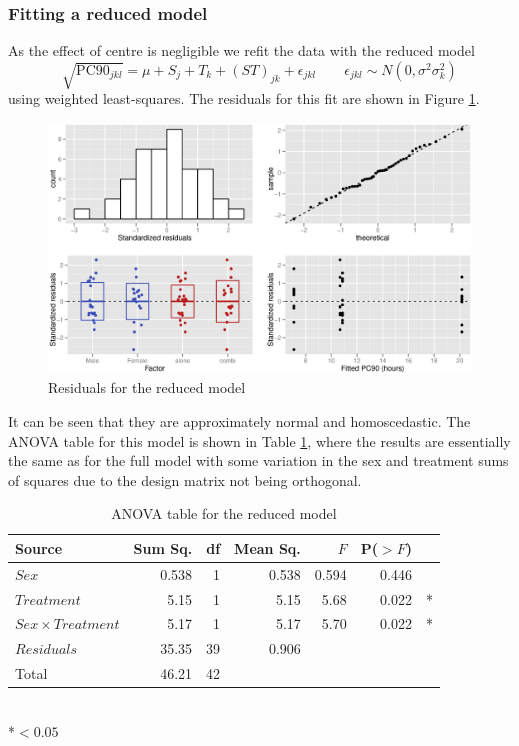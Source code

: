 \subsubsection*{Fitting a reduced model}
As the effect of centre is negligible we refit the data with the reduced model
\begin{equation}
\sqrt{\mathrm{PC}90_{jkl}}=\mu+S_j+T_k+(ST)_{jk}+\epsilon_{jkl}\quad\quad\epsilon_{jkl}\sim N(0,\sigma^{2}\sigma_{k}^2)\label{reduced}
\end{equation}
using weighted least-squares. The residuals for this fit are shown in Figure \ref{aov2rwt}.
\begin{figure}[p]
\includegraphics[width=150mm]{aov2rwt.eps} 
\caption{Residuals for the reduced model}
\label{aov2rwt}
\end{figure}

It can be seen that they are approximately normal and homoscedastic. The ANOVA table for this model is shown in Table \ref{aovreduced}, where the results are essentially the same as for the full model with some variation in the sex and treatment sums of squares due to the design matrix not being orthogonal.
\begin{table}[p]
\centering
\caption{ANOVA table for the reduced model}\label{aovreduced}
\begin{tabular}{l|rrrrrl}
Source&Sum Sq.&df&Mean Sq.&$F$&P($>F$)\\
\hline
$Sex$				& 0.538 & 1 & 0.538 & 0.594 & 0.446 & \\
$Treatment$			& 5.15   & 1 & 5.15   & 5.68   & 0.022 & *\\
$Sex\times Treatment$	& 5.17   & 1 & 5.17   & 5.70   & 0.022 & *\\
$Residuals$			& 35.35 & 39 & 0.906 &&&\\
\hline
Total&46.21&42&&&
\end{tabular}\\
\hspace{20em}*$<0.05$
\end{table}

